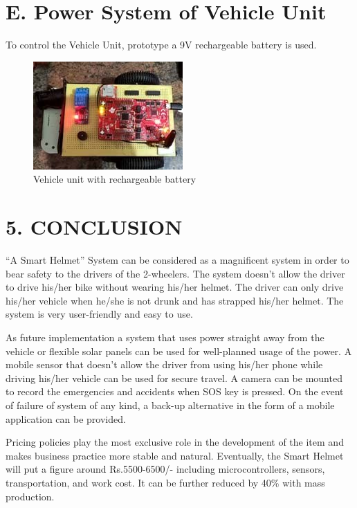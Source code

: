 \section*{E. Power System of Vehicle Unit}
To control the Vehicle Unit, prototype a 9V rechargeable battery is used.
\begin{figure}
	\centering
	\includegraphics[width=0.4\linewidth]{"images/faf af"}
	\captionsetup{labelformat=empty}
	\caption[]{Vehicle unit with rechargeable battery}
	\label{fig:faf-af}
\end{figure}


\section*{5. CONCLUSION}
“A Smart Helmet” System can be considered as a magnificent system in order to bear safety to the drivers of the 2-wheelers. The system doesn’t allow the driver to drive his/her bike without wearing his/her helmet. The driver can only drive his/her vehicle when he/she is not drunk and has strapped his/her helmet. The system is very user-friendly and easy to use.\vspace{.3cm}

As future implementation a system that uses power straight away from the vehicle or flexible solar panels can be used for well-planned usage of the power. A mobile sensor that doesn’t allow the driver from using his/her phone while driving his/her vehicle can be used for secure travel. A camera can be mounted to record the emergencies and accidents when SOS key is pressed. On the event of failure of system of any kind, a back-up alternative in the form of a mobile application can be provided.  \vspace{.3cm}

Pricing policies play the most exclusive role in the development of the item and makes business practice more stable and natural. Eventually, the Smart Helmet will put a figure around Rs.5500-6500/- including microcontrollers, sensors, transportation, and work cost. It can be further reduced by 40\% with mass production.


